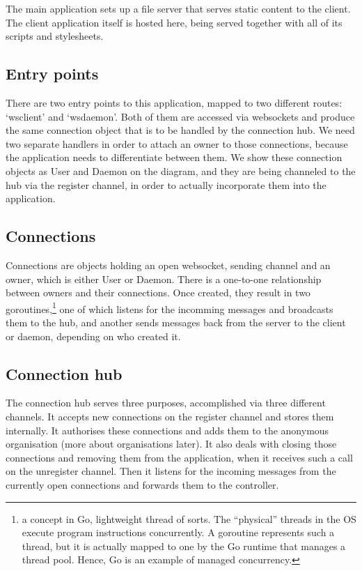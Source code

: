 \documentclass{l3proj}
\begin{document}
The main application sets up a file server that serves static content to the client. The client application itself is hosted here, being served together with all of its scripts and stylesheets.

\subsection{Entry points}

There are two entry points to this application, mapped to two different routes: `wsclient' and `wsdaemon'. Both of them are accessed via websockets and produce the same connection object that is to be handled by the connection hub. We need two separate handlers in order to attach an owner to those connections, because the application needs to differentiate between them. We show these connection objects as User and Daemon on the diagram, and they are being channeled to the hub via the register channel, in order to actually incorporate them into the application.

\subsection{Connections}

Connections are objects holding an open websocket, sending channel and an owner, which is either User or Daemon. There is a one-to-one relationship between owners and their connections. Once created, they result in two goroutines,\footnote{\raggedright{}a concept in Go, lightweight thread of sorts. The ``physical'' threads in the OS execute program instructions concurrently. A goroutine represents such a thread, but it is actually mapped to one by the Go runtime that manages a thread pool. Hence, Go is an example of managed concurrency.} one of which listens for the incomming messages and broadcasts them to the hub, and another sends messages back from the server to the client or daemon, depending on who created it.

\subsection{Connection hub}

The connection hub serves three purposes, accomplished via three different channels. It accepts new connections on the register channel and stores them internally. It authorises these connections and adds them to the anonymous organisation (more about organisations later). It also deals with closing those connections and removing them from the application, when it receives such a call on the unregister channel. Then it listens for the incoming messages from the currently open connections and forwards them to the controller. 
\end{document}
